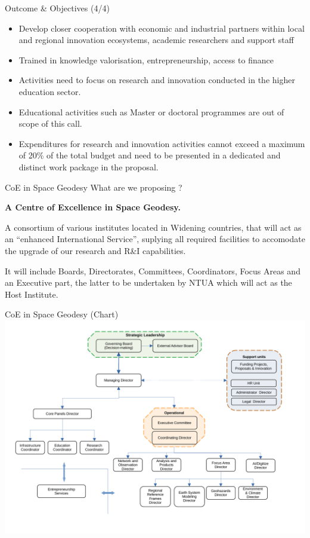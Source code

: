 \documentclass{beamer}
\begin{document}
\begin{frame}{Outcome \& Objectives (4/4)}
  
\begin{itemize}
\item Develop closer cooperation with economic and industrial partners within local and
regional innovation ecosystems, academic researchers and support staff 
\item Trained in knowledge valorisation, entrepreneurship, access to finance
\item Activities need to focus on research and innovation conducted in the higher education sector.
\item Educational activities such as Master or doctoral programmes are out of scope of this call.
\item Expenditures for research and innovation activities cannot exceed a maximum of 20\% of the total 
budget and need to be presented in a dedicated and distinct work package in the proposal.
\end{itemize}
\end{frame}

\begin{frame}{CoE in Space Geodesy}
What are we proposing ?
\vspace{1cm}
\begin{center}
\textbf{A Centre of Excellence in Space Geodesy.}
\end{center}
A consortium of various institutes located in Widening countries, that will 
act as an ``enhanced International Service'', suplying all required facilities to 
accomodate the upgrade of our research and R\&I capabilities.

It will include Boards, Directorates, Committees, Coordinators, Focus Areas and 
an Executive part, the latter to be undertaken by NTUA which will act as the 
Host Institute. 
\end{frame}

\begin{frame}{CoE in Space Geodesy (Chart)}
\centering
\includegraphics[width=\textwidth]{../Structure_draft3.pdf}
\end{frame}
\end{document}
